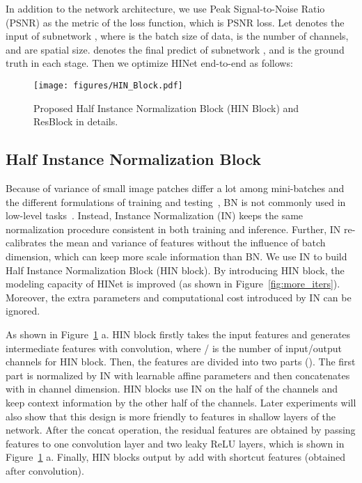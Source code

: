 \documentclass[final]{cvpr}
\begin{document}
In addition to the network architecture, we use Peak Signal-to-Noise Ratio (PSNR)
as the metric of the loss function, which is PSNR loss. Let  denotes the input of subnetwork , where  is the batch size of data,  is the number of channels,  and  are spatial size.  denotes the final predict of subnetwork , and  is the ground truth in each stage. Then we optimize HINet end-to-end as follows:



\begin{figure}
    \centering
    \texttt{[image: figures/HIN\_Block.pdf]}
    \vspace{-0.1cm}
    \caption{Proposed Half Instance Normalization Block (HIN Block) and ResBlock in details.}
    \label{fig:HIN_block}
    \vspace{-0.3cm}
\end{figure}

\subsection{Half Instance Normalization Block}
\label{HIN Block}
Because of variance of small image patches differ a lot among mini-batches and the different formulations of training and testing~\cite{yu2018wide}, BN\cite{ioffe2015batch} is not commonly used in low-level tasks~\cite{ledig2017photo,lim2017enhanced}. Instead, Instance Normalization (IN) keeps the same normalization procedure consistent in both training and inference. Further, IN re-calibrates the mean and variance of features without the influence of batch dimension, which can keep more scale information than BN. We use IN to build Half Instance Normalization Block (HIN block). By introducing HIN block, the modeling capacity of HINet is improved (as shown in Figure~\ref{fig:more_iters}). Moreover, the extra parameters and computational cost introduced by IN can be ignored.

As shown in Figure~\ref{fig:HIN_block} a. HIN block firstly takes the input features  and generates intermediate features  with  convolution, where / is the number of input/output channels for HIN block. Then, the features  are divided into two parts (). The first part  is normalized by IN with learnable affine parameters and then concatenates with  in channel dimension. HIN blocks use IN on the half of the channels and keep context information by the other half of the channels. Later experiments will also show that this design is more friendly to features in shallow layers of the network. After the concat operation, the residual features  are obtained by passing features to one  convolution layer and two leaky ReLU layers, which is shown in Figure~\ref{fig:HIN_block} a. Finally, HIN blocks output  by add  with shortcut features (obtained after  convolution).
\end{document}
